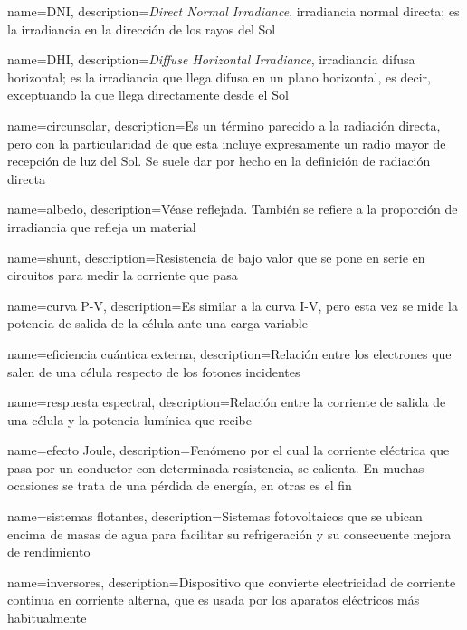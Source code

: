 {
    name={DNI},
    description={\textit{Direct Normal Irradiance}, irradiancia normal directa; es la irradiancia en la dirección de los rayos del Sol}
}

{
    name={DHI},
    description={\textit{Diffuse Horizontal Irradiance}, irradiancia difusa horizontal; es la irradiancia que llega difusa en un plano horizontal, es decir, exceptuando la que llega directamente desde el Sol}
}

{
    name={circunsolar},
    description={Es un término parecido a la radiación \gls{directa}, pero con la particularidad de que esta incluye expresamente un radio mayor de recepción de luz del Sol. Se suele dar por hecho en la definición de radiación \gls{directa}}
}

{
    name={albedo},
    description={Véase \Gls{reflejada}. También se refiere a la proporción de irradiancia que refleja un material}
}

{
    name={shunt},
    description={Resistencia de bajo valor que se pone en serie en circuitos para medir la corriente que pasa}
}

{
    name={curva P-V},
    description={Es similar a la \gls{curva I-V}, pero esta vez se mide la potencia de salida de la célula ante una \gls{carga} variable}
}

{
    name={eficiencia cuántica externa},
    description={Relación entre los electrones que salen de una célula respecto de los fotones incidentes}
}

{
    name={respuesta espectral},
    description={Relación entre la corriente de salida de una célula y la potencia lumínica que recibe}
}

{
    name={efecto Joule},
    description={Fenómeno por el cual la corriente eléctrica que pasa por un conductor con determinada resistencia, se calienta. En muchas ocasiones se trata de una pérdida de energía, en otras es el fin}
}

{
    name={sistemas flotantes},
    description={Sistemas fotovoltaicos que se ubican encima de masas de agua para facilitar su refrigeración y su consecuente mejora de rendimiento}
}

{
    name={inversores},
    description={Dispositivo que convierte electricidad de corriente continua en corriente alterna, que es usada por los aparatos eléctricos más habitualmente}
}

